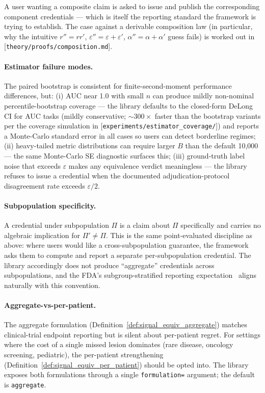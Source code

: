 \documentclass[twoside,11pt]{article}
\begin{document}
A user wanting a composite claim is asked to issue and publish the corresponding component credentials --- which is itself the reporting standard the framework is trying to establish. The case against a derivable composition law (in particular, why the intuitive $r'' = r r'$, $\varepsilon'' = \varepsilon + \varepsilon'$, $\alpha'' = \alpha + \alpha'$ guess fails) is worked out in [\texttt{theory/proofs/composition.md}].

\paragraph{Estimator failure modes.} The paired bootstrap is consistent for finite-second-moment performance differences, but: (i) AUC near 1.0 with small $n$ can produce mildly non-nominal percentile-bootstrap coverage --- the library defaults to the closed-form DeLong CI for AUC tasks (mildly conservative; $\sim 300\times$ faster than the bootstrap variants per the coverage simulation in [\texttt{experiments/estimator\_coverage/}]) and reports a Monte-Carlo standard error in all cases so users can detect borderline regimes; (ii) heavy-tailed metric distributions can require larger $B$ than the default 10{,}000 --- the same Monte-Carlo SE diagnostic surfaces this; (iii) ground-truth label noise that exceeds $\varepsilon$ makes any equivalence verdict meaningless --- the library refuses to issue a credential when the documented adjudication-protocol disagreement rate exceeds $\varepsilon / 2$.

\paragraph{Subpopulation specificity.} A credential under subpopulation $\Pi$ is a claim about $\Pi$ specifically and carries no algebraic implication for $\Pi' \neq \Pi$. This is the same point-evaluated discipline as above: where users would like a cross-subpopulation guarantee, the framework asks them to compute and report a separate per-subpopulation credential. The library accordingly does not produce ``aggregate'' credentials across subpopulations, and the FDA's subgroup-stratified reporting expectation~\citep{fda_aiml_2024} aligns naturally with this convention.

\paragraph{Aggregate-vs-per-patient.} The aggregate formulation (Definition~\ref{def:signal_equiv_aggregate}) matches clinical-trial endpoint reporting but is silent about per-patient regret. For settings where the cost of a single missed lesion dominates (rare disease, oncology screening, pediatric), the per-patient strengthening (Definition~\ref{def:signal_equiv_per_patient}) should be opted into. The library exposes both formulations through a single \texttt{formulation=} argument; the default is \texttt{aggregate}.
\end{document}
